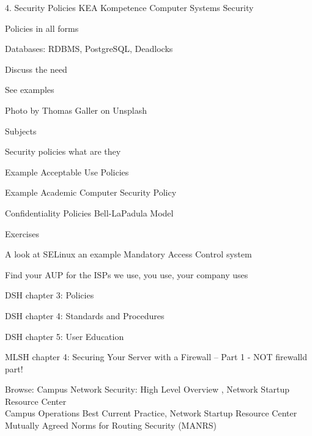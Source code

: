 \documentclass[Screen16to9,17pt]{foils}
\begin{document}
\mytitlepage
{4. Security Policies}
{KEA Kompetence Computer Systems Security \the\year}




\begin{list2}
\item Policies in all forms
\item Databases: RDBMS, PostgreSQL, Deadlocks
\item Discuss the need
\item See examples
\end{list2}

{\small\hfill  Photo by Thomas Galler on Unsplash}


\begin{list1}
\item Subjects
\begin{list2}
\item Security policies what are they
  \item Example Acceptable Use Policies
  \item Example Academic Computer Security Policy
  \item Confidentiality Policies Bell-LaPadula Model
\end{list2}
\item Exercises
\begin{list2}
\item A look at SELinux an example Mandatory Access Control system
\item Find your AUP for the ISPs we use, you use, your company uses
\end{list2}
\end{list1}


\begin{list1}
\item DSH chapter 3: Policies
\item DSH chapter 4: Standards and Procedures
\item DSH chapter 5: User Education
\item MLSH chapter 4: Securing Your Server with a
Firewall – Part 1 - NOT firewalld part!

\item Browse: Campus Network Security: High Level Overview , Network Startup Resource Center\\
Campus Operations Best Current Practice, Network Startup Resource Center\\
Mutually Agreed Norms for Routing Security (MANRS)
\end{list1}
\end{document}
